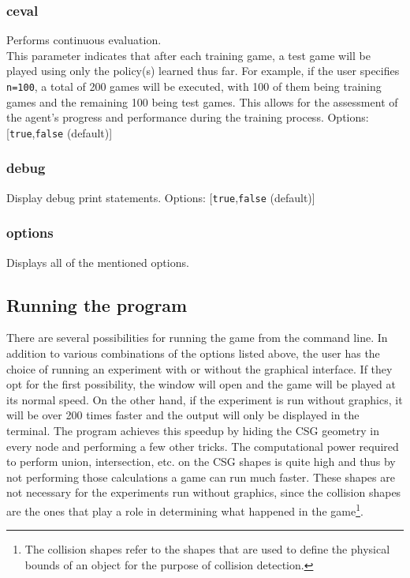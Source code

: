 \subsubsection*{ceval}
\label{opt:ceval}
Performs continuous evaluation.\\
This parameter indicates that after each training game, a test game will be played using only the policy(s) learned thus far. For example, if the user specifies \texttt{n=100}, a total of 200 games will be executed, with 100 of them being training games and the remaining 100 being test games. This allows for the assessment of the agent's progress and performance during the training process. 
Options: [\texttt{true},\texttt{false} (default)]

\subsubsection*{debug}
\label{opt:debug}
Display debug print statements.
Options: [\texttt{true},\texttt{false} (default)]

\subsubsection*{options}
\label{opt:options}
Displays all of the mentioned options.


\subsection{Running the program}
There are several possibilities for running the game from the command line. In addition to various combinations of the options listed above, the user has the choice of running an experiment with or without the graphical interface. If they opt for the first possibility, the window will open and the game will be played at its normal speed. On the other hand, if the experiment is run without graphics, it will be over 200 times faster and the output will only be displayed in the terminal. The program achieves this speedup by hiding the CSG geometry in every node and performing a few other tricks. The computational power required to perform union, intersection, etc. on the CSG shapes is quite high and thus by not performing those calculations a game can run much faster. These shapes are not necessary for the experiments run without graphics, since the collision shapes are the ones that play a role in determining what happened in the game\footnote{The collision shapes refer to the shapes that are used to define the physical bounds of an object for the purpose of collision detection.}.

